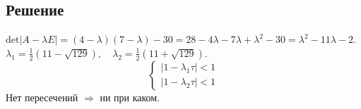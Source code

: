 \documentclass[a4paper, 12pt]{article}
\begin{document}
	\subsection*{Решение}
	$\text{det}\left|A-\lambda E\right|=(4-\lambda)(7-\lambda)-30=28-4\lambda-7\lambda+\lambda^2-30=\lambda^2-11\lambda-2$.\\
	$\lambda_1=\frac{1}{2}(11-\sqrt{129}),\quad\lambda_2=\frac{1}{2}(11+\sqrt{129})$.
	\begin{equation*}
	\begin{cases}
	|1-\lambda_1\tau|<1\\
	|1-\lambda_2\tau|<1
	\end{cases}
	\end{equation*}
	Нет пересечений $\Rightarrow$ ни при каком.
\end{document}
